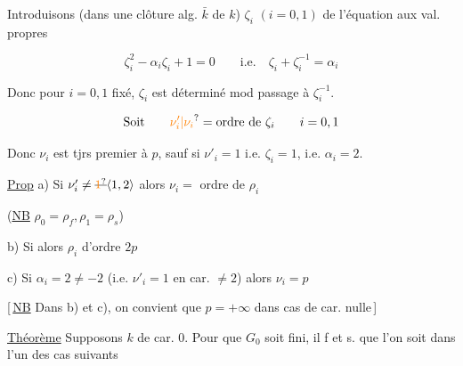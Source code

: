 

Introduisons  (dans une clôture alg. $\bar k$ de $k$) $\zeta_i$ $(i=0,1)$ de l'équation aux val. propres

\[
 \zeta_i^2-\alpha_i\zeta_i+1=0\qquad\text{i.e.}\quad \zeta_i+\zeta_i^{-1}=\alpha_i
\]

Donc pour $i=0,1$ fixé, $\zeta_i$ est déterminé mod passage à $\zeta_i^{-1}$.

\[
 \text{Soit}\qquad\unsure{\nu'_i|\nu_i}=\text{ordre de }\zeta_i\qquad i=0,1
\]

Donc $\nu_i$ est tjrs premier à $p$, sauf si $\nu'_i=1$ i.e. $\zeta_i=1$, i.e. $\alpha_i=2$.


\uline{Prop} a) Si $\nu'_i\ne\deleted{\unsure{1}}\inserted{1,2}$   alors $\nu_i=$ ordre de $\rho_i$

(\uline{NB} $\rho_0=\rho_f,\rho_1=\rho_s$)

b) Si  alors $\rho_i$ d'ordre $2p$

c) 
Si $\alpha_i=2\ne-2$ (i.e. $\nu'_i=1$ en car. $\ne2$) alors $\nu_i=p$

[\,\uline{NB} Dans b) et c), on convient que $p=+\infty$ dans cas de car. nulle\,]

\uline{Théorème} Supposons $k$ de car. $0$. Pour que $G_0$ soit fini, il f et s. que l'on soit dans l'un des  cas suivants



